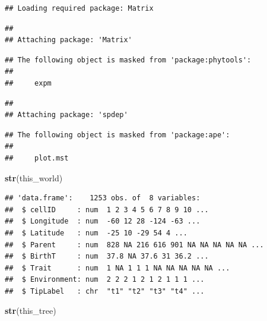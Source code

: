 \documentclass[]{book}
\newenvironment{Shaded}{\begin{snugshade}}{\end{snugshade}}
\newcommand{\KeywordTok}[1]{\textcolor[rgb]{0.13,0.29,0.53}{\textbf{{#1}}}}
\newcommand{\StringTok}[1]{\textcolor[rgb]{0.31,0.60,0.02}{{#1}}}
\newcommand{\OperatorTok}[1]{\textcolor[rgb]{0.81,0.36,0.00}{\textbf{{#1}}}}
\newcommand{\NormalTok}[1]{{#1}}
\theoremstyle{definition}
\theoremstyle{definition}
\theoremstyle{remark}
\begin{document}
\begin{verbatim}
## Loading required package: Matrix
\end{verbatim}

\begin{verbatim}
## 
## Attaching package: 'Matrix'
\end{verbatim}

\begin{verbatim}
## The following object is masked from 'package:phytools':
## 
##     expm
\end{verbatim}

\begin{verbatim}
## 
## Attaching package: 'spdep'
\end{verbatim}

\begin{verbatim}
## The following object is masked from 'package:ape':
## 
##     plot.mst
\end{verbatim}

\begin{Shaded}
\end{Shaded}

\begin{Shaded}
\begin{Highlighting}[]
\KeywordTok{str}\NormalTok{(this_world)}
\end{Highlighting}
\end{Shaded}

\begin{verbatim}
## 'data.frame':    1253 obs. of  8 variables:
##  $ cellID     : num  1 2 3 4 5 6 7 8 9 10 ...
##  $ Longitude  : num  -60 12 28 -124 -63 ...
##  $ Latitude   : num  -25 10 -29 54 4 ...
##  $ Parent     : num  828 NA 216 616 901 NA NA NA NA NA ...
##  $ BirthT     : num  37.8 NA 37.6 31 36.2 ...
##  $ Trait      : num  1 NA 1 1 1 NA NA NA NA NA ...
##  $ Environment: num  2 2 2 1 2 1 2 1 1 1 ...
##  $ TipLabel   : chr  "t1" "t2" "t3" "t4" ...
\end{verbatim}

\begin{Shaded}
\begin{Highlighting}[]
\KeywordTok{str}\NormalTok{(this_tree)}
\end{Highlighting}
\end{Shaded}
\end{document}
